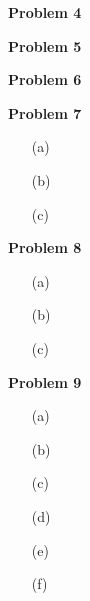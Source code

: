 \documentclass[11pt]{article}
\begin{document}
    \begin{center}
        \Large
        \textbf{Problem 4}
    \end{center}
    \normalsize

    \begin{center}
        \Large
        \textbf{Problem 5}
    \end{center}
    \normalsize

    \begin{center}
        \Large
        \textbf{Problem 6}
    \end{center}
    \normalsize

    \begin{center}
        \Large
        \textbf{Problem 7}
    \end{center}
    \normalsize
    \begin{enumerate}
        \item[(a)] %
        \item[(b)] %
        \item[(c)] %
    \end{enumerate}

    \begin{center}
        \Large
        \textbf{Problem 8}
    \end{center}
    \normalsize
    \begin{enumerate}
        \item[(a)] %
        \item[(b)] %
        \item[(c)] %
    \end{enumerate}

    \begin{center}
        \Large
        \textbf{Problem 9}
    \end{center}
    \normalsize
    \begin{enumerate}
        \item[(a)] %
        \item[(b)] %
        \item[(c)] %
        \item[(d)] %
        \item[(e)] %
        \item[(f)] %
    \end{enumerate}
\end{document}
